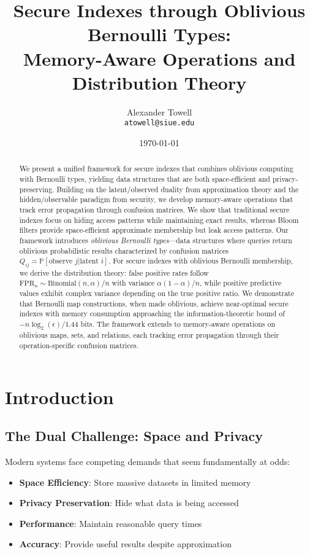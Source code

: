 \documentclass[11pt,final]{article}
\title{Secure Indexes through Oblivious Bernoulli Types:\\
\Large Memory-Aware Operations and Distribution Theory}
\author{
    Alexander Towell\\
    \texttt{atowell@siue.edu}
}
\date{\today}
\newcommand{\FPR}{\text{FPR}}
\newcommand{\bindist}{\text{Binomial}}
\begin{document}
\maketitle

\begin{abstract}
We present a unified framework for secure indexes that combines oblivious computing with Bernoulli types, yielding data structures that are both space-efficient and privacy-preserving. Building on the latent/observed duality from approximation theory and the hidden/observable paradigm from security, we develop memory-aware operations that track error propagation through confusion matrices. We show that traditional secure indexes focus on hiding access patterns while maintaining exact results, whereas Bloom filters provide space-efficient approximate membership but leak access patterns. Our framework introduces \emph{oblivious Bernoulli types}—data structures where queries return oblivious probabilistic results characterized by confusion matrices $Q_{ij} = \mathbb{P}[\text{observe } j | \text{latent } i]$. For secure indexes with oblivious Bernoulli membership, we derive the distribution theory: false positive rates follow $\FPR_n \sim \bindist(n, \alpha)/n$ with variance $\alpha(1-\alpha)/n$, while positive predictive values exhibit complex variance depending on the true positive ratio. We demonstrate that Bernoulli map constructions, when made oblivious, achieve near-optimal secure indexes with memory consumption approaching the information-theoretic bound of $-n\log_2(\epsilon)/1.44$ bits. The framework extends to memory-aware operations on oblivious maps, sets, and relations, each tracking error propagation through their operation-specific confusion matrices.
\end{abstract}


\ObliviousNotationGuide

\section{Introduction}

\subsection{The Dual Challenge: Space and Privacy}

Modern systems face competing demands that seem fundamentally at odds:
\begin{itemize}
    \item \textbf{Space Efficiency}: Store massive datasets in limited memory
    \item \textbf{Privacy Preservation}: Hide what data is being accessed
    \item \textbf{Performance}: Maintain reasonable query times
    \item \textbf{Accuracy}: Provide useful results despite approximation
\end{itemize}
\end{document}
